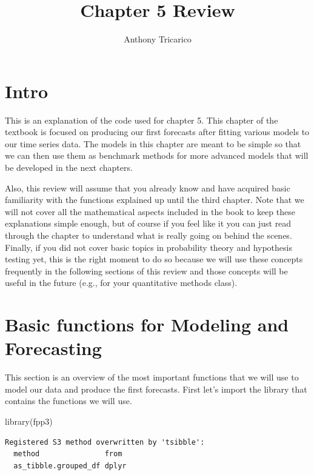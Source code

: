 \documentclass[
  letterpaper,
  DIV=11,
  numbers=noendperiod]{scrartcl}
\title{Chapter 5 Review}
\author{Anthony Tricarico}
\date{}
\newenvironment{Shaded}{\begin{snugshade}}{\end{snugshade}}
\newcommand{\FunctionTok}[1]{\textcolor[rgb]{0.28,0.35,0.67}{#1}}
\newcommand{\NormalTok}[1]{\textcolor[rgb]{0.00,0.23,0.31}{#1}}
\renewcommand*\contentsname{Table of contents}
\newcommand\contentsname{Table of contents}
\begin{document}
\maketitle

\renewcommand*\contentsname{Table of contents}
{
\hypersetup{linkcolor=}
\setcounter{tocdepth}{3}
\tableofcontents
}

\section{Intro}\label{intro}

This is an explanation of the code used for chapter 5. This chapter of
the textbook is focused on producing our first forecasts after fitting
various models to our time series data. The models in this chapter are
meant to be simple so that we can then use them as benchmark methods for
more advanced models that will be developed in the next chapters.

Also, this review will assume that you already know and have acquired
basic familiarity with the functions explained up until the third
chapter. Note that we will not cover all the mathematical aspects
included in the book to keep these explanations simple enough, but of
course if you feel like it you can just read through the chapter to
understand what is really going on behind the scenes. Finally, if you
did not cover basic topics in probability theory and hypothesis testing
yet, this is the right moment to do so because we will use these
concepts frequently in the following sections of this review and those
concepts will be useful in the future (e.g., for your quantitative
methods class).

\section{Basic functions for Modeling and
Forecasting}\label{basic-functions-for-modeling-and-forecasting}

This section is an overview of the most important functions that we will
use to model our data and produce the first forecasts. First let's
import the library that contains the functions we will use.

\begin{Shaded}
\begin{Highlighting}[]
\FunctionTok{library}\NormalTok{(fpp3)}
\end{Highlighting}
\end{Shaded}

\begin{verbatim}
Registered S3 method overwritten by 'tsibble':
  method               from 
  as_tibble.grouped_df dplyr
\end{verbatim}
\end{document}
